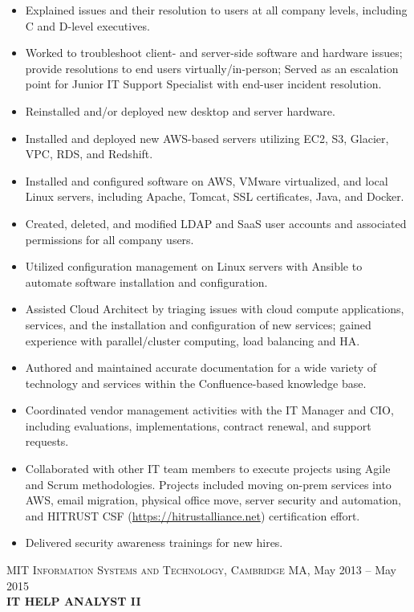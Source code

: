 \documentclass[]{article}
\begin{document}
\begin{itemize}
\item
  Explained issues and their resolution to users at all company levels,
  including C and D-level executives.
\item
  Worked to troubleshoot client- and server-side software and hardware
  issues; provide resolutions to end users virtually/in-person; Served
  as an escalation point for Junior IT Support Specialist with end-user
  incident resolution.
\item
  Reinstalled and/or deployed new desktop and server hardware.
\item
  Installed and deployed new AWS-based servers utilizing EC2, S3,
  Glacier, VPC, RDS, and Redshift.
\item
  Installed and configured software on AWS, VMware virtualized, and
  local Linux servers, including Apache, Tomcat, SSL certificates, Java,
  and Docker.
\item
  Created, deleted, and modified LDAP and SaaS user accounts and
  associated permissions for all company users.
\item
  Utilized configuration management on Linux servers with Ansible to
  automate software installation and configuration.
\item
  Assisted Cloud Architect by triaging issues with cloud compute
  applications, services, and the installation and configuration of new
  services; gained experience with parallel/cluster computing, load
  balancing and HA.
\item
  Authored and maintained accurate documentation for a wide variety of
  technology and services within the Confluence-based knowledge base.
\item
  Coordinated vendor management activities with the IT Manager and CIO,
  including evaluations, implementations, contract renewal, and support
  requests.
\item
  Collaborated with other IT team members to execute projects using
  Agile and Scrum methodologies. Projects included moving on-prem
  services into AWS, email migration, physical office move, server
  security and automation, and HITRUST CSF
  {(}\href{https://hitrustalliance.net/hitrust-csf/}{https://hitrustalliance.net}{)}
  certification effort.
\item
  Delivered security awareness trainings for new hires.
\end{itemize}

\textsc{MIT Information Systems and Technology, Cambridge MA,} May 2013
-- May 2015\\
\textbf{IT HELP ANALYST II}
\end{document}
